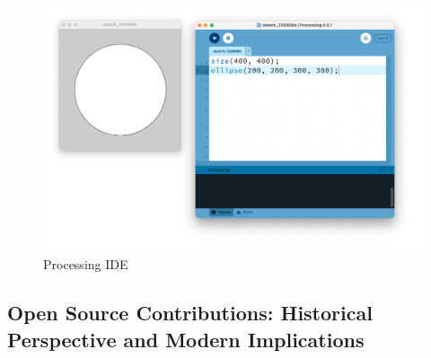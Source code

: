 \begin{figure}
  \includegraphics[width=1\textwidth]{images/processing_ide.png} 
  \caption{Processing IDE \parencite{reasProcessingIDE2015}}
  \label{fig:processing_ide_screenshot}
\end{figure}








\subsection{Open Source Contributions: Historical Perspective and Modern Implications}

